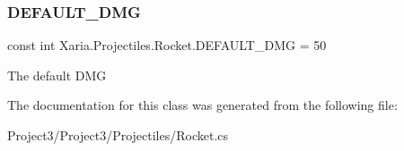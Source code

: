 \subsubsection{\texorpdfstring{D\+E\+F\+A\+U\+L\+T\+\_\+\+D\+MG}{DEFAULT\_DMG}}
{\footnotesize\ttfamily const int Xaria.\+Projectiles.\+Rocket.\+D\+E\+F\+A\+U\+L\+T\+\_\+\+D\+MG = 50}



The default D\+MG 



The documentation for this class was generated from the following file\+:\begin{DoxyCompactItemize}
\item 
Project3/\+Project3/\+Projectiles/Rocket.\+cs\end{DoxyCompactItemize}

